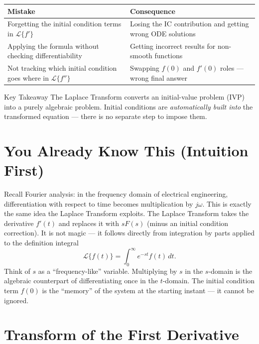 \documentclass[12pt,a4paper]{article}
\begin{document}
\medskip
\begin{center}
\begin{tabular}{@{}p{7cm}p{7cm}@{}}
\toprule
\textbf{Mistake} & \textbf{Consequence} \\
\midrule
Forgetting the initial condition terms in
$\mathcal{L}\{f'\}$ &
Losing the IC contribution and getting wrong ODE solutions \\
\midrule
Applying the formula without checking differentiability &
Getting incorrect results for non-smooth functions \\
\midrule
Not tracking which initial condition goes where in
$\mathcal{L}\{f''\}$ &
Swapping $f(0)$ and $f'(0)$ roles --- wrong final answer \\
\bottomrule
\end{tabular}
\end{center}

\begin{learnbox}{Key Takeaway}
The Laplace Transform converts an initial-value problem (IVP) into a
purely algebraic problem. Initial conditions are \emph{automatically
built into} the transformed equation --- there is no separate step to
impose them.
\end{learnbox}

\section{You Already Know This (Intuition First)}

Recall Fourier analysis: in the frequency domain of electrical
engineering, differentiation with respect to time becomes multiplication
by $j\omega$. This is exactly the same idea the Laplace Transform
exploits. The Laplace Transform takes the derivative $f'(t)$ and replaces
it with $sF(s)$ (minus an initial condition correction). It is not magic
--- it follows directly from integration by parts applied to the
definition integral
\[
  \mathcal{L}\{f(t)\} = \int_0^\infty e^{-st} f(t)\,dt.
\]
Think of $s$ as a ``frequency-like'' variable. Multiplying by $s$ in the
$s$-domain is the algebraic counterpart of differentiating once in the
$t$-domain. The initial condition term $f(0)$ is the ``memory'' of the
system at the starting instant --- it cannot be ignored.

\section{Transform of the First Derivative}
\end{document}
